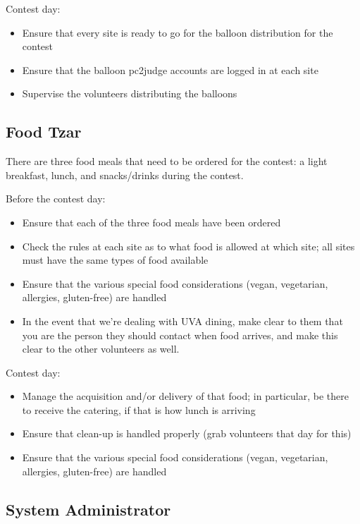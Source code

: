 \documentclass[11pt,twoside,letterpaper]{book}
\newenvironment{itemlist}{
\begin{itemize}
\setlength{\itemsep}{0pt}
\setlength{\parskip}{0pt}}
{\end{itemize}}
\begin{document}
\noindent Contest day:

\begin{itemlist}
\item Ensure that every site is ready to go for the balloon
  distribution for the contest
\item Ensure that the balloon pc2judge accounts are logged in at each
  site
\item Supervise the volunteers distributing the balloons
\end{itemlist}


\subsection{Food Tzar}

There are three food meals that need to be ordered for the contest:
a light breakfast, lunch, and snacks/drinks during the contest.

\noindent Before the contest day:

\begin{itemlist}
\item Ensure that each of the three food meals have been ordered
\item Check the rules at each site as to what food is allowed at which
  site; all sites must have the same types of food available
\item Ensure that the various special food considerations (vegan,
  vegetarian, allergies, gluten-free) are handled
\item In the event that we're dealing with UVA dining, make clear to
  them that you are the person they should contact when food arrives,
  and make this clear to the other volunteers as well.
\end{itemlist}

\noindent Contest day:

\begin{itemlist}
\item Manage the acquisition and/or delivery of that food; in
  particular, be there to receive the catering, if that is how lunch
  is arriving
\item Ensure that clean-up is handled properly (grab volunteers that
  day for this)
\item Ensure that the various special food considerations (vegan,
  vegetarian, allergies, gluten-free) are handled
\end{itemlist}


\subsection{System Administrator}
\end{document}
